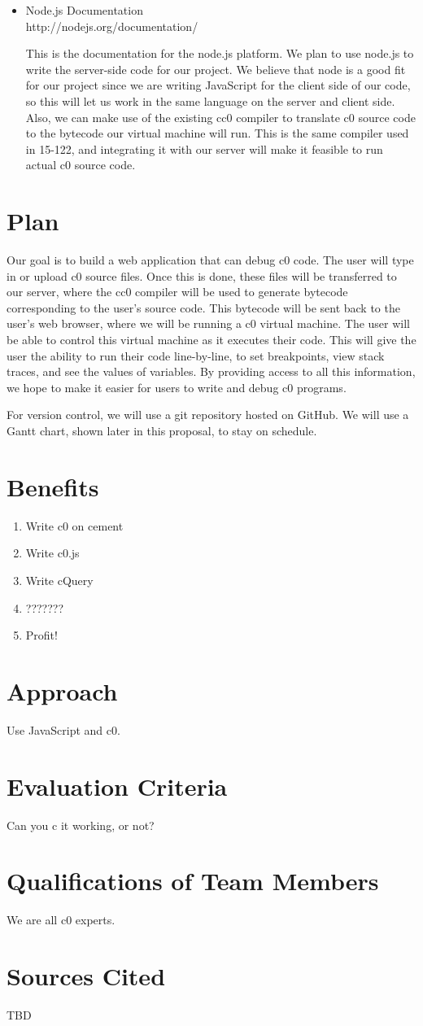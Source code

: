 \documentclass[11pt]{article}
\begin{document}
\begin{itemize}
\item Node.js Documentation\\
  http://nodejs.org/documentation/
  \par
  This is the documentation for the node.js platform.  We plan to use
  node.js to write the server-side code for our project.  We believe
  that node is a good fit for our project since we are writing
  JavaScript for the client side of our code, so this will let us work
  in the same language on the server and client side.  Also, we can
  make use of the existing cc0 compiler to translate c0 source code to
  the bytecode our virtual machine will run. This is the same compiler
  used in 15-122, and integrating it with our server will make it
  feasible to run actual c0 source code.
\end{itemize}
\section{Plan}
\par
Our goal is to build a web application that can debug c0 code.
The user will type in or upload c0 source files.
Once this is done, these files will be transferred to our server,
where the cc0 compiler will be used to
generate bytecode corresponding to the user's source code.
This bytecode will be sent back to the user's web browser,
where we will be running a c0 virtual machine.
The user will be able to control this virtual machine as it executes their code. 
This will give the user the ability to run their code line-by-line,
to set breakpoints, view stack traces, and see the values of variables.
By providing access to all this information,
we hope to make it easier for users to write and debug c0 programs.
\par
For version control, we will use a git repository hosted on GitHub. 
We will use a Gantt chart, shown later in this proposal, to stay on schedule.


\section{Benefits}
\begin{enumerate}
\item Write c0 on cement
\item Write c0.js
\item Write cQuery
\item ???????
\item Profit!
\end{enumerate}

\section{Approach}
Use JavaScript and c0.

\section{Evaluation Criteria}
Can you c it working, or not?

\section{Qualifications of Team Members}
We are all c0 experts.

\section{Sources Cited}
TBD
\end{document}
